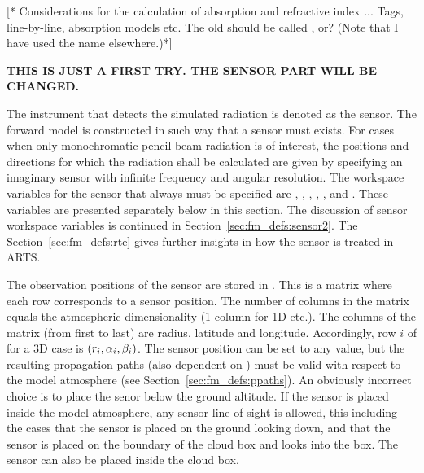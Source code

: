 \label{sec:fm_defs:absorption}

[* Considerations for the calculation of absorption and refractive
index ...  Tags, line-by-line, absorption models etc. The old
 should be called , or? (Note that I
have used the name  elsewhere.)*]



\label{sec:fm_defs:sensor1}

{\bf THIS IS JUST A FIRST TRY. THE SENSOR PART WILL BE CHANGED.}

The instrument that detects the simulated radiation is denoted as the
sensor. The forward model is constructed in such
way that a sensor must exists. For cases when only monochromatic
pencil beam radiation is of interest, the positions and directions for
which the radiation shall be calculated are given by specifying an
imaginary sensor with infinite frequency and angular resolution. The
workspace variables for the sensor that always must be specified are
, ,
, ,
,  and
. These variables are presented separately below in this
section. The discussion of sensor workspace variables is continued in
Section~\ref{sec:fm_defs:sensor2}. The Section~\ref{sec:fm_defs:rte}
gives further insights in how the sensor is treated in ARTS.


\label{sec:fm_defs:sensorpos}

The observation positions of the sensor are stored in
. This is a matrix where each row corresponds to a
sensor position. The number of columns in the matrix equals the
atmospheric dimensionality (1 column for 1D etc.). The columns of the
matrix (from first to last) are radius, latitude and longitude.
Accordingly, row $i$ of  for a 3D case is
$(r_{i},\alpha_{i},\beta_{i})$. The sensor position can be set to any
value, but the resulting propagation paths (also dependent on
) must be valid with respect to the model atmosphere
(see Section~\ref{sec:fm_defs:ppaths}). An obviously incorrect choice
is to place the senor below the ground altitude. If the sensor is
placed inside the model atmosphere, any sensor line-of-sight is
allowed, this including the cases that the sensor is placed on the
ground looking down, and that the sensor is placed on the boundary of
the cloud box and looks into the box. The sensor can also be placed
inside the cloud box.

